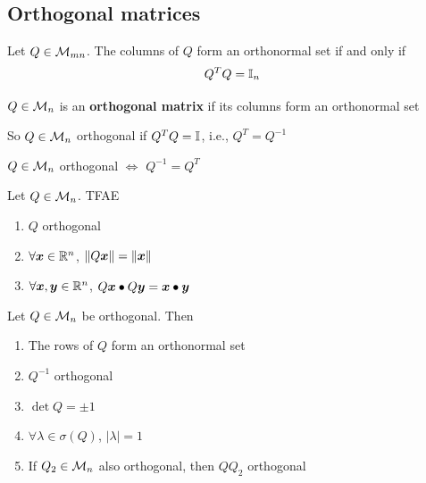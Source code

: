 \documentclass[aspectratio=169]{beamer}\usepackage[]{graphicx}\usepackage[]{xcolor}
\begin{document}
\subsection{Orthogonal matrices}

\begin{frame}
\begin{theorem}
Let $Q\in\mathcal{M}_{mn}$. The columns of $Q$ form an orthonormal set if and only if
\[
Q^TQ=\mathbb{I}_n
\]
\end{theorem}
\begin{definition}
$Q\in\mathcal{M}_n$ is an \textbf{orthogonal matrix} if its columns form an orthonormal set 
\end{definition}
So $Q\in\mathcal{M}_n$ orthogonal if $Q^TQ=\mathbb{I}$, i.e., $Q^T=Q^{-1}$
\begin{theorem}
$Q\in\mathcal{M}_n$ orthogonal $\iff$ $Q^{-1} = Q^T$
\end{theorem}
\end{frame}


\begin{frame}
\begin{theorem}
\label{th:TFAE_orthogonal_matrices}
Let $Q\in\mathcal{M}_n$. TFAE
\begin{enumerate}
\item $Q$ orthogonal
\item $\forall\bm{x}\in\mathbb{R}^n$, $\|Q\bm{x}\|=\|\bm{x}\|$
\item $\forall\bm{x},\bm{y}\in\mathbb{R}^n$, $Q\bm{x}\bullet Q\bm{y}=\bm{x}\bullet\bm{y}$
\end{enumerate}
\end{theorem}
\vfill
\begin{theorem}\label{th:properties_orthogonal_matrices}
Let $Q\in\mathcal{M}_n$ be orthogonal. Then
\begin{enumerate}
\item The rows of $Q$ form an orthonormal set
\item $Q^{-1}$ orthogonal
\item $\det Q=\pm 1$
\item $\forall\lambda\in\sigma(Q)$, $|\lambda|=1$
\item If $Q_2\in\mathcal{M}_n$ also orthogonal, then $QQ_2$ orthogonal
\end{enumerate}
\end{theorem}
\end{frame}
\end{document}
